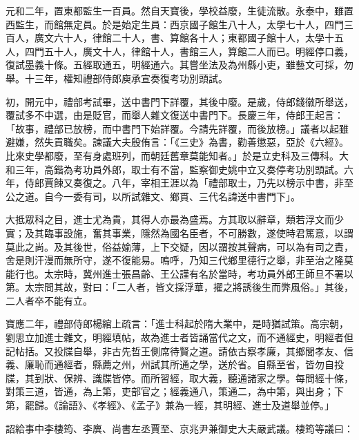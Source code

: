 \begin{pinyinscope}
 元和二年，置東都監生一百員。然自天寶後，學校益廢，生徒流散。永泰中，雖置西監生，而館無定員。於是始定生員：西京國子館生八十人，太學七十人，四門三百人，廣文六十人，律館二十人，書、算館各十人；東都國子館十人，太學十五人，四門五十人，廣文十人，律館十人，書館三人，算館二人而已。明經停口義，復試墨義十條。五經取通五，明經通六。其嘗坐法及為州縣小吏，雖藝文可採，勿舉。十三年，權知禮部侍郎庾承宣奏復考功別頭試。



 初，開元中，禮部考試畢，送中書門下詳覆，其後中廢。是歲，侍郎錢徽所舉送，覆試多不中選，由是貶官，而舉人雜文復送中書門下。長慶三年，侍郎王起言：「故事，禮部已放榜，而中書門下始詳覆。今請先詳覆，而後放榜。」議者以起雖避嫌，然失貢職矣。諫議大夫殷侑言：「《三史》為書，勸善懲惡，亞於《六經》。比來史學都廢，至有身處班列，而朝廷舊章莫能知者。」於是立史科及三傳科。大和三年，高鍇為考功員外郎，取士有不當，監察御史姚中立又奏停考功別頭試。六年，侍郎賈餗又奏復之。八年，宰相王涯以為「禮部取士，乃先以榜示中書，非至公之道。自今一委有司，以所試雜文、鄉貫、三代名諱送中書門下」。



 大抵眾科之目，進士尤為貴，其得人亦最為盛焉。方其取以辭章，類若浮文而少實；及其臨事設施，奮其事業，隱然為國名臣者，不可勝數，遂使時君篤意，以謂莫此之尚。及其後世，俗益媮薄，上下交疑，因以謂按其聲病，可以為有司之責，舍是則汗漫而無所守，遂不復能易。嗚呼，乃知三代鄉里德行之舉，非至治之隆莫能行也。太宗時，冀州進士張昌齡、王公謹有名於當時，考功員外郎王師旦不署以第。太宗問其故，對曰：「二人者，皆文採浮華，擢之將誘後生而弊風俗。」其後，二人者卒不能有立。



 寶應二年，禮部侍郎楊綰上疏言：「進士科起於隋大業中，是時猶試策。高宗朝，劉思立加進士雜文，明經填帖，故為進士者皆誦當代之文，而不通經史，明經者但記帖括。又投牒自舉，非古先哲王側席待賢之道。請依古察孝廉，其鄉閭孝友、信義、廉恥而通經者，縣薦之州，州試其所通之學，送於省。自縣至省，皆勿自投牒，其到狀、保辨、識牒皆停。而所習經，取大義，聽通諸家之學。每問經十條，對策三道，皆通，為上第，吏部官之；經義通八，策通二，為中第，與出身；下第，罷歸。《論語》、《孝經》、《孟子》兼為一經，其明經、進士及道舉並停。」



 詔給事中李棲筠、李廙、尚書左丞賈至、京兆尹兼御史大夫嚴武議。棲筠等議曰：




\end{pinyinscope}
